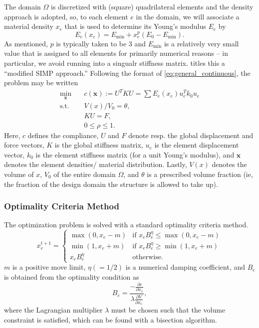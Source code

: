 The domain $\Omega$ is discretized with (square) quadrilateral elements and the density approach is adopted,
so, to each element $e$ in the domain, we will associate a material density $x_e$ that is used to determine
its Young's modulus $E_e$ by
\begin{equation}
    E_e(x_e) = E_{\text{min}} + x_e^p (E_0 - E_{\text{min}}).
\end{equation}
As mentioned, $p$ is typically taken to be $3$ and $E_{\text{min}}$ is a relatively very small value
that is assigned to all elements for primarily numerical reasons -- in particular, we avoid running into
a singualr stiffness matrix. \cite{andreassen_clausen_schevenels_lazarov_sigmund_2010} titles this a
``modified SIMP approach.'' Following the format of \autoref{eq:general_continuous}, the problem may be
written
\begin{equation}\label{eq:top88_problem}
    \begin{aligned}
        \min_{\mathbf{x}} &\quad c(\mathbf{x}) := U^T K U = \sum E_e(x_e) u_e^T k_0 u_e\\
        \text{s.t.} &\quad V(x)/ V_0 = \theta,\\
            &\quad KU = F,\\
            &\quad 0 \leq \rho \leq 1.
    \end{aligned}
\end{equation}
Here, $c$ defines the compliance, $U$ and $F$ denote resp. the global displacement and force vectors, $K$
is the global stiffness matrix, $u_e$ is the element displacement vector, $k_0$ is the element stiffness
matrix (for a unit Young's modulus), and $\mathbf{x}$ denotes the element densities/ material distribution.
Lastly, $V(x)$ denotes the volume of $x$, $V_0$ of the entire domain $\Omega$, and $\theta$ is a prescribed
volume fraction (ie, the fraction of the design domain the structure is allowed to take up).

\subsubsection{Optimality Criteria Method}

The optimization problem is solved with a standard optimality criteria method.
\begin{equation}
    x_e^{t+1} = \begin{cases}
        \max(0, x_e - m) & \text{if } x_e B_e^\eta \leq \max(0, x_e - m)\\
        \min(1, x_e + m) & \text{if } x_e B_e^\eta \geq \min(1, x_e + m)\\
        x_e B_e^\eta & \text{otherwise.}
    \end{cases}
\end{equation}
$m$ is a positive move limit, $\eta (= 1/2)$ is a numerical damping coefficient, and $B_e$ is obtained
from the optimality condition as
\begin{equation}
    B_e = \frac{-\frac{\partial c}{\partial x_e}}{\lambda \frac{\partial V}{\partial x_e}},
\end{equation}
where the Lagrangian multiplier $\lambda$ must be chosen such that the volume constraint is satisfied, which
can be found with a bisection algorithm.

